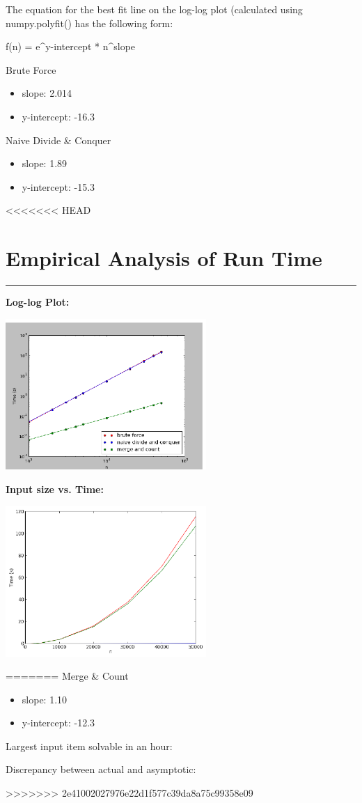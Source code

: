 \documentclass[letterpaper,10pt,titlepage,fleqn]{article}
\begin{document}
The equation for the best fit line on the log-log plot (calculated using numpy.polyfit() has the following form:

f(n) = e^y-intercept * n^slope

Brute Force
\begin{itemize}
\item slope: 2.014
\item y-intercept: -16.3
\end{itemize}

Naive Divide & Conquer
\begin{itemize}
\item slope: 1.89
\item y-intercept: -15.3
\end{itemize}

<<<<<<< HEAD
\section*{Empirical Analysis of Run Time}
\hrule

\textbf{Log-log Plot:}
\vskip 0.04in
\begin{center}
  \includegraphics[width=3in]{loglog.ps}
\end{center}

\textbf{Input size vs. Time:}
\vskip 0.04in
\begin{center}
  \includegraphics[width=3in]{input_time.ps}
\end{center}
=======
Merge & Count
\begin{itemize}
\item slope: 1.10
\item y-intercept: -12.3
\end{itemize}

Largest input item solvable in an hour:

Discrepancy between actual and asymptotic:

>>>>>>> 2e41002027976e22d1f577c39da8a75c99358e09
\end{document}
